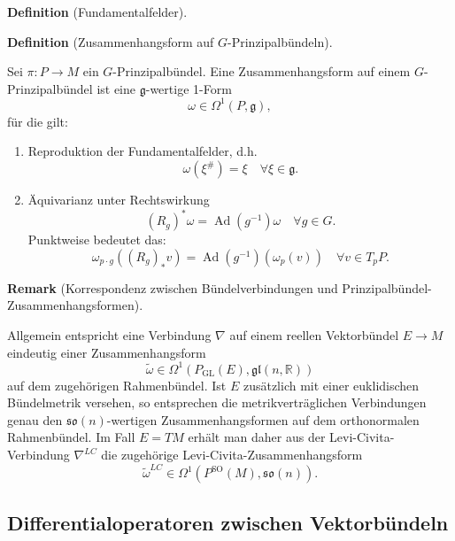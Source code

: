 \documentclass[10pt, letterpaper]{article}
\newcommand{\R}{\mathbb{R}}
\newcommand{\GL}{\mathrm{GL}}
\newcommand{\SO}{\mathrm{SO}}
\newcommand{\CustomHeading}[3]{%
  \par\medskip\noindent%
  \textbf{#1 #2} \textnormal{(#3)}.\enskip%
}
\newenvironment{DEF}[2]{\CustomHeading{Definition}{#1}{#2}}{}
\newenvironment{REM}[2]{\CustomHeading{Remark}{#1}{#2}}{}
\begin{document}
\begin{DEF}{}{{\color{blue}Fundamentalfelder}}
  
\end{DEF}

\begin{DEF}{}{Zusammenhangsform auf $G$-Prinzipalbündeln}
  Sei $\pi:P\to M$ ein $G$-Prinzipalbündel. Eine Zusammenhangsform auf einem $G$-Prinzipalbündel ist eine $\mathfrak{g}$-wertige 1-Form
  $$
  \omega \in \Omega^1(P, \mathfrak{g}),
  $$
  für die gilt:
  \begin{enumerate}
    \item Reproduktion der Fundamentalfelder, d.h. 
    $$
    \omega\left(\xi^{\#}\right)=\xi \quad \forall \xi \in \mathfrak{g} .
    $$
    \item Äquivarianz unter Rechtswirkung
    $$
    \left(R_g\right)^* \omega=\operatorname{Ad}\left(g^{-1}\right) \omega \quad \forall g \in G .
    $$
    Punktweise bedeutet das:
    $$
    \omega_{p \cdot g}\left(\left(R_g\right)_* v\right)=\operatorname{Ad}\left(g^{-1}\right)\left(\omega_p(v)\right) \quad \forall v \in T_p P .
    $$
  \end{enumerate}
\end{DEF}


{\color{blue}\begin{REM}{}{Korrespondenz zwischen Bündelverbindungen und Prinzipalbündel-Zusammenhangsformen}
Allgemein entspricht eine Verbindung \(\nabla\) auf einem reellen Vektorbündel
\(E\to M\) eindeutig einer Zusammenhangsform
\[
\widetilde\omega\in \Omega^1(P_{\GL}(E),\mathfrak{gl}(n,\R))
\]
auf dem zugehörigen Rahmenbündel. Ist \(E\) zusätzlich mit einer euklidischen
Bündelmetrik versehen, so entsprechen die metrikverträglichen Verbindungen genau
den \(\mathfrak{so}(n)\)-wertigen Zusammenhangsformen auf dem orthonormalen
Rahmenbündel. Im Fall \(E=TM\) erhält man daher aus der Levi-Civita-Verbindung
\(\nabla^{LC}\) die zugehörige Levi-Civita-Zusammenhangsform
\[
\widetilde\omega^{LC}\in \Omega^1(P^{\SO}(M),\mathfrak{so}(n)).
\]
\end{REM}}

\subsection{Differentialoperatoren zwischen Vektorbündeln}
\end{document}
